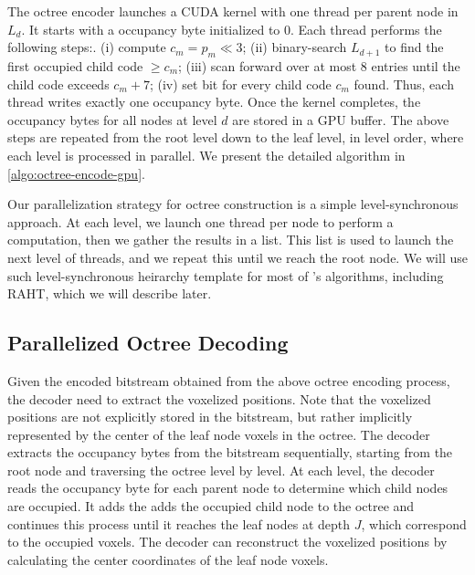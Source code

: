 The octree encoder launches a CUDA kernel with one thread per parent node in $L_d$.
%
It starts with a occupancy byte initialized to 0.
%
Each thread performs the following steps:.
(i) compute $c_m = p_m \ll 3$;
(ii) binary-search $L_{d+1}$ to find the first occupied child code $\geq c_m$;
(iii) scan forward over at most 8 entries until the child code exceeds $c_m+7$;
(iv) set bit for every child code $c_m$ found.
%
Thus, each thread writes exactly one occupancy byte.
%
Once the kernel completes, the occupancy bytes for all nodes at level $d$ are stored in a GPU buffer.
%
The above steps are repeated from the root level down to the leaf level, \ie in level order, where each level is processed in parallel.
%
We present the detailed algorithm in \cref{algo:octree-encode-gpu}.

Our parallelization strategy for octree construction is a simple level-synchronous approach. 
%
At each level, we launch one thread per node to perform a computation, then we gather the results in a list. 
%
This list is used to launch the next level of threads, and we repeat this until we reach the root node. 
%
We will use such level-synchronous heirarchy template for most of \gsnfs's algorithms, including RAHT, which we will describe later.

\subsection{Parallelized Octree Decoding}\label{sec:octree-decode-gpu}
Given the encoded bitstream obtained from the above octree encoding process, the decoder need to extract the voxelized positions.
%
Note that the voxelized positions are not explicitly stored in the bitstream, but rather implicitly represented by the center of the leaf node voxels in the octree.
%
The decoder extracts the occupancy bytes from the bitstream sequentially, starting from the root node and traversing the octree level by level.
%
At each level, the decoder reads the occupancy byte for each parent node to determine which child nodes are occupied.
%
It adds the adds the occupied child node to the octree and continues this process until it reaches the leaf nodes at depth $J$, which correspond to the occupied voxels.
%
The decoder can reconstruct the voxelized positions by calculating the center coordinates of the leaf node voxels.

